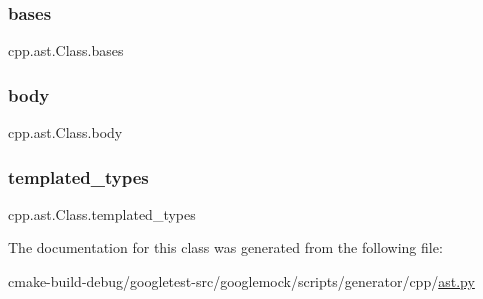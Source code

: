\subsubsection{\texorpdfstring{bases}{bases}}
{\footnotesize\ttfamily cpp.\+ast.\+Class.\+bases}

\mbox{\label{classcpp_1_1ast_1_1Class_add39f61fdcf6dae42d79cac3dcbb7782}} 
\subsubsection{\texorpdfstring{body}{body}}
{\footnotesize\ttfamily cpp.\+ast.\+Class.\+body}

\mbox{\label{classcpp_1_1ast_1_1Class_a48ed0d3115656554d9134bc1787390fa}} 
\subsubsection{\texorpdfstring{templated\_types}{templated\_types}}
{\footnotesize\ttfamily cpp.\+ast.\+Class.\+templated\+\_\+types}



The documentation for this class was generated from the following file\+:\begin{DoxyCompactItemize}
\item 
cmake-\/build-\/debug/googletest-\/src/googlemock/scripts/generator/cpp/\mbox{\hyperlink{ast_8py}{ast.\+py}}\end{DoxyCompactItemize}
